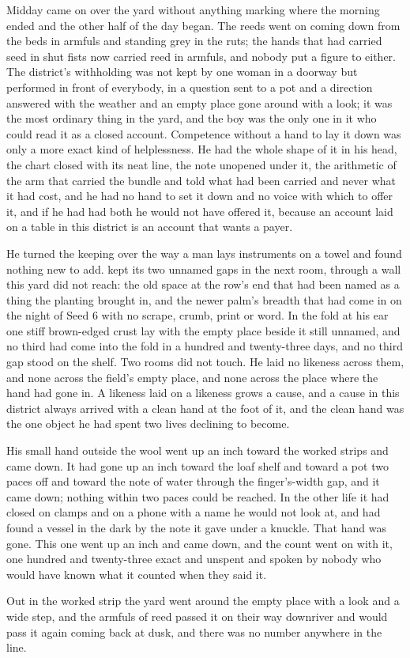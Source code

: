 Midday came on over the yard without anything marking where the morning ended and the other half of the day began. The reeds went on coming down from the beds in armfuls and standing grey in the ruts; the hands that had carried seed in shut fists now carried reed in armfuls, and nobody put a figure to either. The district's withholding was not kept by one woman in a doorway but performed in front of everybody, in a question sent to a pot and a direction answered with the weather and an empty place gone around with a look; it was the most ordinary thing in the yard, and the boy was the only one in it who could read it as a closed account. Competence without a hand to lay it down was only a more exact kind of helplessness. He had the whole shape of it in his head, the chart closed with its neat line, the note unopened under it, the arithmetic of the arm that carried the bundle and told what had been carried and never what it had cost, and he had no hand to set it down and no voice with which to offer it, and if he had had both he would not have offered it, because an account laid on a table in this district is an account that wants a payer.

He turned the keeping over the way a man lays instruments on a towel and found nothing new to add.  kept its two unnamed gaps in the next room, through a wall this yard did not reach: the old space at the row's end that had been named as a thing the planting brought in, and the newer palm's breadth that had come in on the night of Seed 6 with no scrape, crumb, print or word. In the fold at his ear one stiff brown-edged crust lay with the empty place beside it still unnamed, and no third had come into the fold in a hundred and twenty-three days, and no third gap stood on the shelf. Two rooms did not touch. He laid no likeness across them, and none across the field's empty place, and none across the place where the hand had gone in. A likeness laid on a likeness grows a cause, and a cause in this district always arrived with a clean hand at the foot of it, and the clean hand was the one object he had spent two lives declining to become.

His small hand outside the wool went up an inch toward the worked strips and came down. It had gone up an inch toward the loaf shelf and toward a pot two paces off and toward the note of water through the finger's-width gap, and it came down; nothing within two paces could be reached. In the other life it had closed on clamps and on a phone with a name he would not look at, and had found a vessel in the dark by the note it gave under a knuckle. That hand was gone. This one went up an inch and came down, and the count went on with it, one hundred and twenty-three exact and unspent and spoken by nobody who would have known what it counted when they said it.

Out in the worked strip the yard went around the empty place with a look and a wide step, and the armfuls of reed passed it on their way downriver and would pass it again coming back at dusk, and there was no number anywhere in the line.

